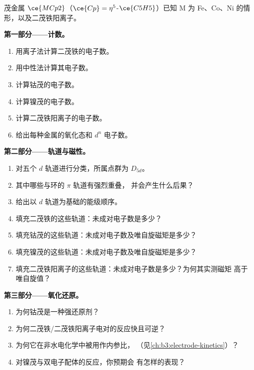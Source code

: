 \begin{problem}
\label{pb:b3:organometallic-bonding:1}
茂金属 $\ce{MCp2}$（$\ce{Cp} = \eta^5$-$\ce{C5H5}$）已知 M 为 Fe、Co、Ni 的情形，以及二茂铁阳离子。

\medskip\noindent\textbf{第一部分——计数。}
\begin{enumerate}
  \item 用离子法计算二茂铁的电子数。
  \item 用中性法计算其电子数。
  \item 计算钴茂的电子数。
  \item 计算镍茂的电子数。
  \item 计算二茂铁阳离子的电子数。
  \item 给出每种金属的氧化态和 $d^n$ 电子数。
\end{enumerate}

\medskip\noindent\textbf{第二部分——轨道与磁性。}
\begin{enumerate}[resume]
  \item 对五个 $d$ 轨道进行分类，所属点群为 $D_{5d}$。
  \item 其中哪些与环的 $\pi$ 轨道有强烈重叠，
        并会产生什么后果？
  \item 给出以 $d$ 轨道为基础的能级顺序。
  \item 填充二茂铁的这些轨道：未成对电子数是多少？
  \item 填充钴茂的这些轨道：未成对电子数及唯自旋磁矩是多少？
  \item 填充镍茂的这些轨道：未成对电子数及唯自旋磁矩是多少？
  \item 填充二茂铁阳离子的这些轨道：未成对电子数是多少？为何其实测磁矩
        高于唯自旋值？
\end{enumerate}

\medskip\noindent\textbf{第三部分——氧化还原。}
\begin{enumerate}[resume]
  \item 为何钴茂是一种强还原剂？
  \item 为何二茂铁/二茂铁阳离子电对的反应快且可逆？
  \item 为何它在非水电化学中被用作内参比，
        （见\cref{ch:b3:electrode-kinetics}）？
  \item 对镍茂与双电子配体的反应，你预期会
        有怎样的表现？
\end{enumerate}


\end{problem}

